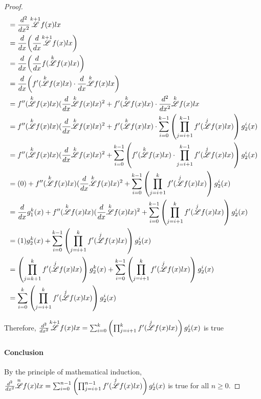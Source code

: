 \documentclass[12pt, letterpaper]{article}
\begin{document}
\begin{proof}
    \begin{align*}
        &= \frac{d^2}{dx^2}\overset{k+1}{\mathscr{L}} f(x) lx \\
        &= \frac{d}{dx}\bigg(\frac{d}{dx}\overset{k+1}{\mathscr{L}} f(x) lx\bigg)\\
        &= \frac{d}{dx}\bigg(\frac{d}{dx}f(\overset{k}{\mathscr{L}} f(x) lx)\bigg)\\
        &= \frac{d}{dx}\bigg(f'(\overset{k}{\mathscr{L}} f(x) lx)\cdot\frac{d}{dx}\overset{k}{\mathscr{L}} f(x) lx\bigg)\\
        &= f''(\overset{k}{\mathscr{L}} f(x) lx)(\frac{d}{dx}\overset{k}{\mathscr{L}} f(x) lx)^2+f'(\overset{k}{\mathscr{L}} f(x) lx)\cdot\frac{d^2}{dx^2}\overset{k}{\mathscr{L}} f(x) lx\\
        &= f''(\overset{k}{\mathscr{L}} f(x) lx)(\frac{d}{dx}\overset{k}{\mathscr{L}} f(x) lx)^2+f'(\overset{k}{\mathscr{L}} f(x) lx)\cdot\sum^{k-1}_{i=0}\left(\prod^{k-1}_{j=i+1}f'(\overset{j}{\mathscr{L}}f(x)lx)\right)g^i_2(x)\\
        &= f''(\overset{k}{\mathscr{L}} f(x) lx)(\frac{d}{dx}\overset{k}{\mathscr{L}} f(x) lx)^2+\sum^{k-1}_{i=0}\left(f'(\overset{k}{\mathscr{L}} f(x) lx)\cdot\prod^{k-1}_{j=i+1}f'(\overset{j}{\mathscr{L}}f(x)lx)\right)g^i_2(x)\\
        &= (0) + f''(\overset{k}{\mathscr{L}} f(x) lx)(\frac{d}{dx}\overset{k}{\mathscr{L}} f(x) lx)^2+\sum^{k-1}_{i=0}\left(\prod^{k}_{j=i+1}f'(\overset{j}{\mathscr{L}}f(x)lx)\right)g^i_2(x)\\
        &= \frac{d}{dx}g^k_1(x)+ f''(\overset{k}{\mathscr{L}} f(x) lx)(\frac{d}{dx}\overset{k}{\mathscr{L}} f(x) lx)^2+\sum^{k-1}_{i=0}\left(\prod^{k}_{j=i+1}f'(\overset{j}{\mathscr{L}}f(x)lx)\right)g^i_2(x)\\
        &= (1)g^k_2(x)+\sum^{k-1}_{i=0}\left(\prod^{k}_{j=i+1}f'(\overset{j}{\mathscr{L}}f(x)lx)\right)g^i_2(x)\\
        &= \left(\prod^{k}_{j=k+1}f'(\overset{j}{\mathscr{L}}f(x)lx)\right)g^k_2(x)+\sum^{k-1}_{i=0}\left(\prod^{k}_{j=i+1}f'(\overset{j}{\mathscr{L}}f(x)lx)\right)g^i_2(x)\\
        &= \sum^{k}_{i=0}\left(\prod^{k}_{j=i+1}f'(\overset{j}{\mathscr{L}}f(x)lx)\right)g^i_2(x)\\
    \end{align*}

    Therefore, $\frac{d^2}{dx^2}\overset{k+1}{\mathscr{L}} f(x) lx = \sum^{k}_{i=0}\left(\prod^{k}_{j=i+1}f'(\overset{j}{\mathscr{L}}f(x)lx)\right)g^i_2(x)$ is true

    \paragraph{Conclusion} By the principle of mathematical induction, \\$\frac{d^2}{dx^2}\overset{n}{\mathscr{L}} f(x) lx = \sum^{n-1}_{i=0}\left(\prod^{n-1}_{j=i+1}f'(\overset{j}{\mathscr{L}}f(x)lx)\right)g^i_2(x)$ is true for all $n \ge 0$.
    
\end{proof}
\end{document}
